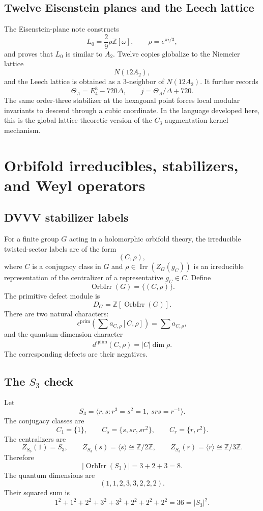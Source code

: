 \documentclass[11pt]{article}
\DeclareMathOperator{\Irr}{Irr}
\newcommand{\ZZ}{\mathbb Z}
\begin{document}
\subsection{Twelve Eisenstein planes and the Leech lattice}

The Eisenstein-plane note constructs
\[
        L_0=\frac{2}{9}\rho\ZZ[\omega],
        \qquad \rho=e^{\pi i/3},
\]
and proves that $L_0$ is similar to $A_2$.  Twelve copies globalize to the Niemeier lattice
\[
        N(12A_2),
\]
and the Leech lattice is obtained as a $3$-neighbor of $N(12A_2)$.  It further records
\[
        \Theta_\Lambda=E_4^3-720\Delta,
        \qquad
        j=\Theta_\Lambda/\Delta+720.
\]
The same order-three stabilizer at the hexagonal point forces local modular invariants to descend through a cubic coordinate.  In the language developed here, this is the global lattice-theoretic version of the $C_3$ augmentation-kernel mechanism.

\section{Orbifold irreducibles, stabilizers, and Weyl operators}

\subsection{DVVV stabilizer labels}

For a finite group $G$ acting in a holomorphic orbifold theory, the irreducible twisted-sector labels are of the form
\[
        (C,\rho),
\]
where $C$ is a conjugacy class in $G$ and $\rho\in\Irr(Z_G(g_C))$ is an irreducible representation of the centralizer of a representative $g_C\in C$.  Define
\[
        \operatorname{OrbIrr}(G)=\{(C,\rho)\}.
\]
The primitive defect module is
\[
        D_G=\ZZ[\operatorname{OrbIrr}(G)].
\]
There are two natural characters:
\[
        \epsilon^{\mathrm{prim}}\left(\sum a_{C,\rho}[C,\rho]\right)=\sum a_{C,\rho},
\]
and the quantum-dimension character
\[
        d^{\mathrm{qdim}}(C,\rho)=|C|\dim\rho.
\]
The corresponding defects are their negatives.

\subsection{The $S_3$ check}

Let
\[
        S_3=\langle r,s:r^3=s^2=1,\ srs=r^{-1}\rangle.
\]
The conjugacy classes are
\[
        C_1=\{1\},\qquad C_s=\{s,sr,sr^2\},\qquad C_r=\{r,r^2\}.
\]
The centralizers are
\[
        Z_{S_3}(1)=S_3,
        \qquad
        Z_{S_3}(s)=\langle s\rangle\cong\ZZ/2\ZZ,
        \qquad
        Z_{S_3}(r)=\langle r\rangle\cong\ZZ/3\ZZ.
\]
Therefore
\[
        |\operatorname{OrbIrr}(S_3)|=3+2+3=8.
\]
The quantum dimensions are
\[
        (1,1,2,3,3,2,2,2).
\]
Their squared sum is
\[
        1^2+1^2+2^2+3^2+3^2+2^2+2^2+2^2=36=|S_3|^2.
\]
\end{document}

